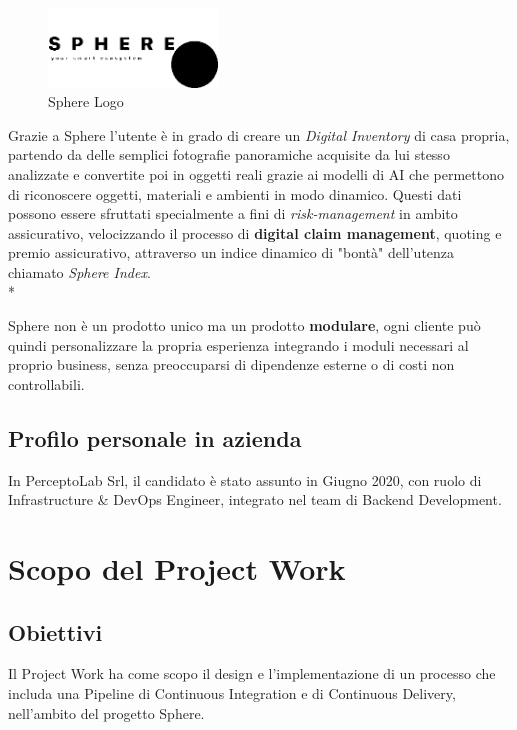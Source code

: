 \documentclass[a4paper,12pt]{report}
\begin{document}
			\begin{figure}[h]
				\centering
				\includegraphics[width=0.4\textwidth]{logo_sphere}
				\caption{Sphere Logo}
				\label{fig:logo_sphere}
			\end{figure}
			
			Grazie a Sphere l'utente è in grado di creare un \emph{Digital Inventory} di casa propria, partendo da delle semplici fotografie panoramiche acquisite da lui stesso analizzate e convertite poi in oggetti reali grazie ai modelli di AI che permettono di riconoscere oggetti, materiali e ambienti in modo dinamico. Questi dati possono essere sfruttati specialmente a fini di \emph{risk-management} in ambito assicurativo, velocizzando il processo di \textbf{digital claim management}, quoting e premio assicurativo, attraverso un indice dinamico di "bontà" dell'utenza chiamato \emph{Sphere Index}.\\*
			
			Sphere non è un prodotto unico ma un prodotto \textbf{modulare}, ogni cliente può quindi personalizzare la propria esperienza integrando i moduli necessari al proprio business, senza preoccuparsi di dipendenze esterne o di costi non controllabili.
	
		\subsection{Profilo personale in azienda}
		
			In PerceptoLab Srl, il candidato è stato assunto in Giugno 2020, con ruolo di Infrastructure \& DevOps Engineer, integrato nel team di Backend Development.
	
	\section{Scopo del Project Work}
	
		\subsection{Obiettivi}
	
			Il Project Work ha come scopo il design e l'implementazione di un processo che includa una Pipeline di Continuous
			Integration e di Continuous Delivery, nell'ambito del progetto Sphere.
			
\end{document}
